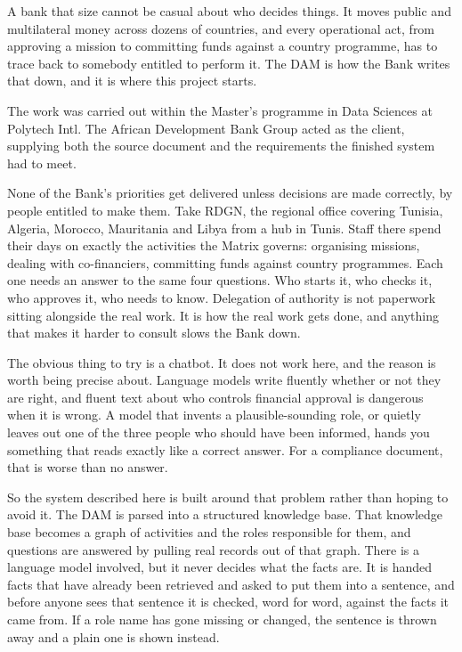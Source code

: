 A bank that size cannot be casual about who decides things. It moves public and
multilateral money across dozens of countries, and every operational act, from
approving a mission to committing funds against a country programme, has to
trace back to somebody entitled to perform it. The DAM is how the Bank writes
that down, and it is where this project starts.

The work was carried out within the Master's programme in Data Sciences at
Polytech Intl. The African Development Bank Group acted as the client, supplying
both the source document and the requirements the finished system had to meet.


None of the Bank's priorities get delivered unless decisions are made correctly,
by people entitled to make them. Take RDGN, the regional office covering
Tunisia, Algeria, Morocco, Mauritania and Libya from a hub in Tunis. Staff there
spend their days on exactly the activities the Matrix governs: organising
missions, dealing with co-financiers, committing funds against country
programmes. Each one needs an answer to the same four questions. Who starts it,
who checks it, who approves it, who needs to know. Delegation of authority is
not paperwork sitting alongside the real work. It is how the real work gets
done, and anything that makes it harder to consult slows the Bank down.


The obvious thing to try is a chatbot. It does not work here, and the reason is
worth being precise about. Language models write fluently whether or not they
are right, and fluent text about who controls financial approval is dangerous
when it is wrong. A model that invents a plausible-sounding role, or quietly
leaves out one of the three people who should have been informed, hands you
something that reads exactly like a correct answer. For a compliance document,
that is worse than no answer.

So the system described here is built around that problem rather than hoping to
avoid it. The DAM is parsed into a structured knowledge base. That knowledge
base becomes a graph of activities and the roles responsible for them, and
questions are answered by pulling real records out of that graph. There is a
language model involved, but it never decides what the facts are. It is handed
facts that have already been retrieved and asked to put them into a sentence,
and before anyone sees that sentence it is checked, word for word, against the
facts it came from. If a role name has gone missing or changed, the sentence is
thrown away and a plain one is shown instead.

